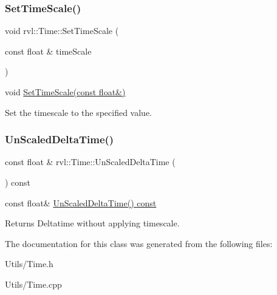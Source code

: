 \subsubsection{\texorpdfstring{Set\+Time\+Scale()}{SetTimeScale()}}
{\footnotesize\ttfamily void rvl\+::\+Time\+::\+Set\+Time\+Scale (\begin{DoxyParamCaption}\item[{const float \&}]{time\+Scale }\end{DoxyParamCaption})}



void \hyperlink{classrvl_1_1_time_a6033a29cb79140a95337f78fe3de4f8a}{Set\+Time\+Scale(const float\&)} 

Set the timescale to the specified value. \mbox{\label{classrvl_1_1_time_a2edf11a18558efa227b3170eae433b3c}} 
\subsubsection{\texorpdfstring{Un\+Scaled\+Delta\+Time()}{UnScaledDeltaTime()}}
{\footnotesize\ttfamily const float \& rvl\+::\+Time\+::\+Un\+Scaled\+Delta\+Time (\begin{DoxyParamCaption}{ }\end{DoxyParamCaption}) const}



const float\& \hyperlink{classrvl_1_1_time_a2edf11a18558efa227b3170eae433b3c}{Un\+Scaled\+Delta\+Time() const} 

\begin{DoxyReturn}{Returns}
Deltatime without applying timescale. 
\end{DoxyReturn}


The documentation for this class was generated from the following files\+:\begin{DoxyCompactItemize}
\item 
Utils/Time.\+h\item 
Utils/Time.\+cpp\end{DoxyCompactItemize}

